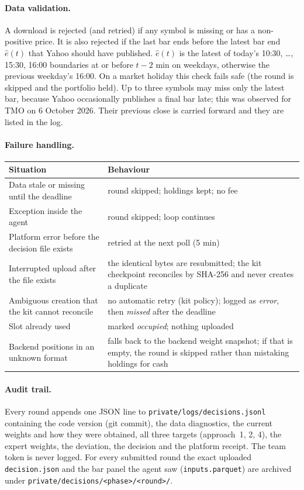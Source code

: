 \documentclass[11pt,a4paper]{article}
\newcommand{\code}[1]{\texttt{#1}}
\begin{document}
\paragraph{Data validation.} A download is rejected (and retried) if any symbol is missing or has a non-positive price.
It is also rejected if the last bar ends before the latest bar end $\hat e(t)$ that Yahoo should have published.
$\hat e(t)$ is the latest of today's 10:30, \dots, 15:30, 16:00 boundaries at or before $t-2$ min on weekdays,
otherwise the previous weekday's 16:00. On a market holiday this check fails safe (the round is skipped and the
portfolio held). Up to three symbols may miss only the latest bar, because Yahoo occasionally publishes a final bar late;
this was observed for TMO on 6 October 2026. Their previous close is carried forward and they are listed in the log.

\paragraph{Failure handling.}
\begin{center}\small
\begin{tabularx}{\linewidth}{lX}
\toprule
Situation & Behaviour \\
\midrule
Data stale or missing until the deadline & round skipped; holdings kept; no fee \\
Exception inside the agent & round skipped; loop continues \\
Platform error before the decision file exists & retried at the next poll (5 min) \\
Interrupted upload after the file exists & the identical bytes are resubmitted; the kit checkpoint reconciles by SHA-256 and never creates a duplicate \\
Ambiguous creation that the kit cannot reconcile & no automatic retry (kit policy); logged as \emph{error}, then \emph{missed} after the deadline \\
Slot already used & marked \emph{occupied}; nothing uploaded \\
Backend positions in an unknown format & falls back to the backend weight snapshot; if that is empty, the round is skipped rather than mistaking holdings for cash \\
\bottomrule
\end{tabularx}
\end{center}

\paragraph{Audit trail.} Every round appends one JSON line to \code{private/logs/decisions.jsonl} containing the code
version (git commit), the data diagnostics, the current weights and how they were obtained, all three targets
(approach~1, 2, 4), the expert weights, the deviation, the decision and the platform receipt. The team token is never
logged. For every submitted round the exact uploaded \code{decision.json} and the bar panel the agent saw
(\code{inputs.parquet}) are archived under \code{private/decisions/<phase>/<round>/}.
\end{document}
